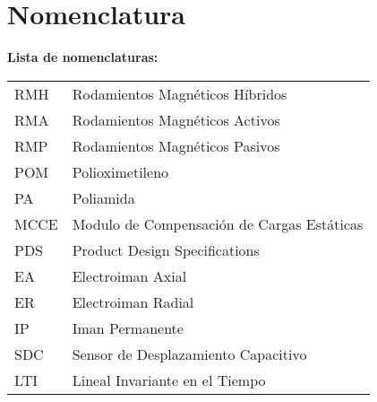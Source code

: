 \chapter{Nomenclatura}

\textbf{Lista de nomenclaturas:}\\


\begin{tabular}{ll}
	RMH\hspace{3cm} & Rodamientos Magn\'eticos H\'ibridos\\
	RMA\hspace{3cm} & Rodamientos Magn\'eticos Activos\\
	RMP\hspace{3cm} & Rodamientos Magn\'eticos Pasivos\\
	POM\hspace{3cm} & Polioximetileno \\
	PA\hspace{3cm} & Poliamida\\
	MCCE\hspace{3cm} & Modulo de Compensaci\'on de Cargas Est\'aticas\\
	PDS\hspace{3cm} & Product Design Specifications\\ 
	EA\hspace{3cm} & Electroiman Axial\\
	ER\hspace{3cm} & Electroiman Radial\\
	IP\hspace{3cm} & Iman Permanente\\
	SDC\hspace{3cm} & Sensor de Desplazamiento Capacitivo\\
	LTI\hspace{3cm} & Lineal Invariante en el Tiempo
\end{tabular}

